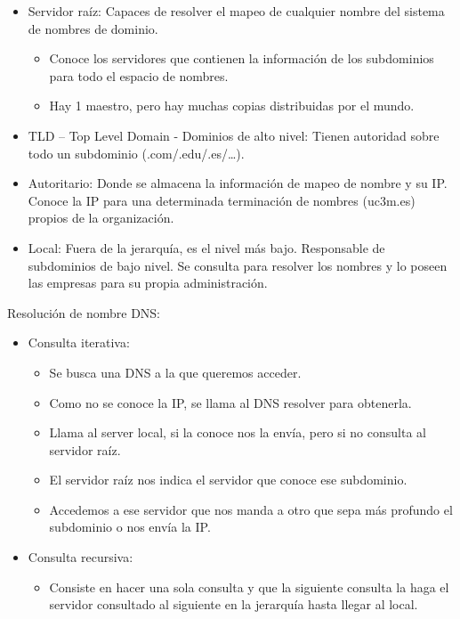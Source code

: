 \documentclass[12pt, twoside, openright]{report} %
\begin{document}
\begin{itemize}
	\item Servidor raíz: Capaces de resolver el mapeo de cualquier nombre
	      del sistema de nombres de dominio.

	      \begin{itemize}
		      \item Conoce los servidores que contienen la información de los
		            subdominios para todo el espacio de nombres.
		      \item Hay 1 maestro, pero hay muchas copias distribuidas por el mundo.
	      \end{itemize}
	\item TLD -- Top Level Domain - Dominios de alto nivel: Tienen autoridad
	      sobre todo un subdominio (.com/.edu/.es/\ldots).
	\item Autoritario: Donde se almacena la información de mapeo de nombre y
	      su IP. Conoce la IP para una determinada terminación de nombres
	      (uc3m.es) propios de la organización.
	\item Local: Fuera de la jerarquía, es el nivel más bajo. Responsable de
	      subdominios de bajo nivel. Se consulta para resolver los nombres y
	      lo poseen las empresas para su propia administración.
\end{itemize}

Resolución de nombre DNS:

\begin{itemize}
	\item Consulta iterativa:

	      \begin{itemize}
		      \item Se busca una DNS a la que queremos acceder.
		      \item Como no se conoce la IP, se llama al DNS resolver para
		            obtenerla.
		      \item Llama al server local, si la conoce nos la envía, pero si no
		            consulta al servidor raíz.
		      \item El servidor raíz nos indica el servidor que conoce ese
		            subdominio.
		      \item Accedemos a ese servidor que nos manda a otro que sepa más
		            profundo el subdominio o nos envía la IP.
	      \end{itemize}
	\item Consulta recursiva:

	      \begin{itemize}
		      \item Consiste en hacer una sola consulta y que la siguiente consulta
		            la haga el servidor consultado al siguiente en la jerarquía
		            hasta llegar al local.
	      \end{itemize}
\end{itemize}
\end{document}
